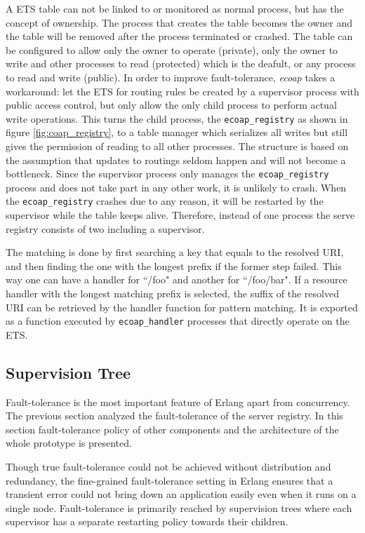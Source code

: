 A ETS table can not be linked to or monitored as normal process, but has the concept of ownership. The process that creates the table becomes the owner and the table will be removed after the process terminated or crashed. The table can be configured to allow only the owner to operate (private), only the owner to write and other processes to read (protected) which is the deafult, or any process to read and write (public). In order to improve fault-tolerance, \textit{ecoap} takes a workaround: let the ETS for routing rules be created by a supervisor process with public access control, but only allow the only child process to perform actual write operations. This turns the child process, the \verb|ecoap_registry| as shown in figure \ref{fig:coap_registry}, to a table manager which serializes all writes but still gives the permission of reading to all other processes. The structure is based on the assumption that updates to routings seldom happen and will not become a bottleneck. Since the supervisor process only manages the \verb|ecoap_registry| process and does not take part in any other work, it is unlikely to crash. When the \verb|ecoap_registry| crashes due to any reason, it will be restarted by the supervisor while the table keeps alive. Therefore, instead of one process the serve registry consists of two including a supervisor. 

The matching is done by first searching a key that equals to the resolved URI, and then finding the one with the longest prefix if the former step failed. This way one can have a handler for ``/foo" and another for ``/foo/bar". If a resource handler with the longest matching prefix is selected, the suffix of the resolved URI can be retrieved by the handler function for pattern matching. It is exported as a function executed by \verb|ecoap_handler| processes that directly operate on the ETS. 

\subsection{Supervision Tree}\label{supervision_tree}

Fault-tolerance is the most important feature of Erlang apart from concurrency. The previous section analyzed the fault-tolerance of the server registry. In this section fault-tolerance policy of other components and the architecture of the whole prototype is presented.

Though true fault-tolerance could not be achieved without distribution and redundancy, the fine-grained fault-tolerance setting in Erlang ensures that a transient error could not bring down an application easily even when it runs on a single node. Fault-tolerance is primarily reached by supervision trees where each supervisor has a separate restarting policy towards their children. 

